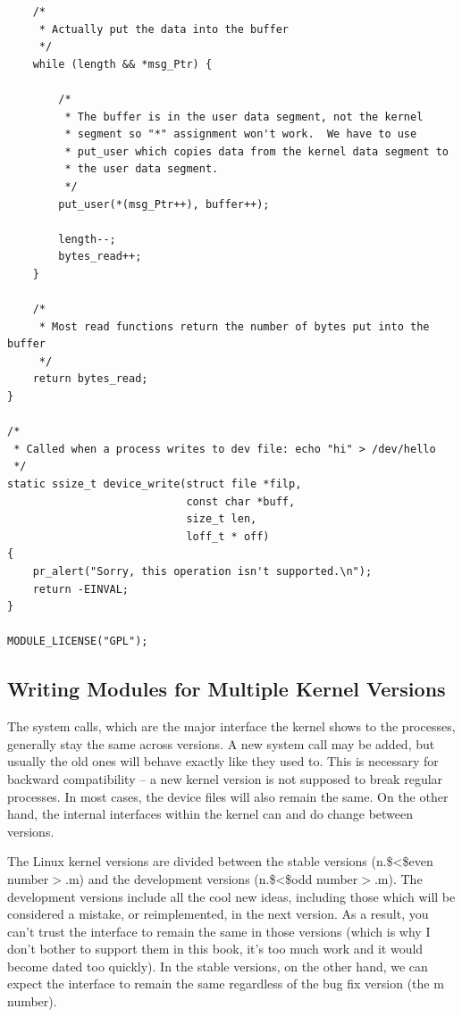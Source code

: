 \documentclass[11pt]{article}
\begin{document}
\begin{verbatim}
    /*
     * Actually put the data into the buffer
     */
    while (length && *msg_Ptr) {

        /*
         * The buffer is in the user data segment, not the kernel
         * segment so "*" assignment won't work.  We have to use
         * put_user which copies data from the kernel data segment to
         * the user data segment.
         */
        put_user(*(msg_Ptr++), buffer++);

        length--;
        bytes_read++;
    }

    /*
     * Most read functions return the number of bytes put into the buffer
     */
    return bytes_read;
}

/*
 * Called when a process writes to dev file: echo "hi" > /dev/hello
 */
static ssize_t device_write(struct file *filp,
                            const char *buff,
                            size_t len,
                            loff_t * off)
{
    pr_alert("Sorry, this operation isn't supported.\n");
    return -EINVAL;
}

MODULE_LICENSE("GPL");
\end{verbatim}

\subsection*{Writing Modules for Multiple Kernel Versions}
\label{sec-6-6}
The system calls, which are the major interface the kernel shows to the processes, generally stay the same across versions. A new system call may be added, but usually the old ones will behave exactly like they used to. This is necessary for backward compatibility -- a new kernel version is not supposed to break regular processes. In most cases, the device files will also remain the same. On the other hand, the internal interfaces within the kernel can and do change between versions.

The Linux kernel versions are divided between the stable versions (n.\$<\$even number$>$.m) and the development versions (n.\$<\$odd number$>$.m). The development versions include all the cool new ideas, including those which will be considered a mistake, or reimplemented, in the next version. As a result, you can't trust the interface to remain the same in those versions (which is why I don't bother to support them in this book, it's too much work and it would become dated too quickly). In the stable versions, on the other hand, we can expect the interface to remain the same regardless of the bug fix version (the m number).
\end{document}
